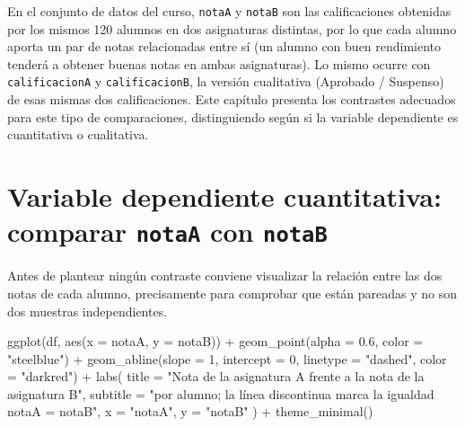\documentclass[
  spanish,
  a4paper,
]{scrreport}
\newenvironment{Shaded}{\begin{snugshade}}{\end{snugshade}}
\newcommand{\AttributeTok}[1]{\textcolor[rgb]{0.40,0.45,0.13}{#1}}
\newcommand{\DecValTok}[1]{\textcolor[rgb]{0.68,0.00,0.00}{#1}}
\newcommand{\FloatTok}[1]{\textcolor[rgb]{0.68,0.00,0.00}{#1}}
\newcommand{\FunctionTok}[1]{\textcolor[rgb]{0.28,0.35,0.67}{#1}}
\newcommand{\NormalTok}[1]{\textcolor[rgb]{0.00,0.23,0.31}{#1}}
\newcommand{\SpecialCharTok}[1]{\textcolor[rgb]{0.37,0.37,0.37}{#1}}
\newcommand{\StringTok}[1]{\textcolor[rgb]{0.13,0.47,0.30}{#1}}
\theoremstyle{definition}
\theoremstyle{definition}
\theoremstyle{remark}
\begin{document}
En el conjunto de datos del curso, \texttt{notaA} y \texttt{notaB} son
las calificaciones obtenidas por los mismos 120 alumnos en dos
asignaturas distintas, por lo que cada alumno aporta un par de notas
relacionadas entre sí (un alumno con buen rendimiento tenderá a obtener
buenas notas en ambas asignaturas). Lo mismo ocurre con
\texttt{calificacionA} y \texttt{calificacionB}, la versión cualitativa
(Aprobado / Suspenso) de esas mismas dos calificaciones. Este capítulo
presenta los contrastes adecuados para este tipo de comparaciones,
distinguiendo según si la variable dependiente es cuantitativa o
cualitativa.

\section{\texorpdfstring{Variable dependiente cuantitativa: comparar
\texttt{notaA} con
\texttt{notaB}}{Variable dependiente cuantitativa: comparar notaA con notaB}}\label{variable-dependiente-cuantitativa-comparar-notaa-con-notab}

Antes de plantear ningún contraste conviene visualizar la relación entre
las dos notas de cada alumno, precisamente para comprobar que están
pareadas y no son dos muestras independientes.

\begin{Shaded}
\begin{Highlighting}[]
\FunctionTok{ggplot}\NormalTok{(df, }\FunctionTok{aes}\NormalTok{(}\AttributeTok{x =}\NormalTok{ notaA, }\AttributeTok{y =}\NormalTok{ notaB)) }\SpecialCharTok{+}
  \FunctionTok{geom\_point}\NormalTok{(}\AttributeTok{alpha =} \FloatTok{0.6}\NormalTok{, }\AttributeTok{color =} \StringTok{"steelblue"}\NormalTok{) }\SpecialCharTok{+}
  \FunctionTok{geom\_abline}\NormalTok{(}\AttributeTok{slope =} \DecValTok{1}\NormalTok{, }\AttributeTok{intercept =} \DecValTok{0}\NormalTok{, }\AttributeTok{linetype =} \StringTok{"dashed"}\NormalTok{, }\AttributeTok{color =} \StringTok{"darkred"}\NormalTok{) }\SpecialCharTok{+}
  \FunctionTok{labs}\NormalTok{(}
    \AttributeTok{title =} \StringTok{"Nota de la asignatura A frente a la nota de la asignatura B"}\NormalTok{,}
    \AttributeTok{subtitle =} \StringTok{"por alumno; la línea discontinua marca la igualdad notaA = notaB"}\NormalTok{,}
    \AttributeTok{x =} \StringTok{"notaA"}\NormalTok{,}
    \AttributeTok{y =} \StringTok{"notaB"}
\NormalTok{  ) }\SpecialCharTok{+}
  \FunctionTok{theme\_minimal}\NormalTok{()}
\end{Highlighting}
\end{Shaded}
\end{document}

